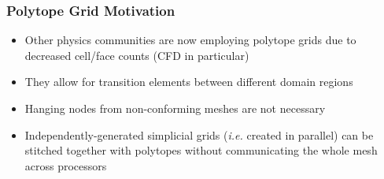 \documentclass[compress,10pt]{beamer}
\begin{document}
\begin{frame}[t]\frametitle{Polytope Grid Motivation}
         \begin{block}{}{\footnotesize
			\begin{itemize}
				\item <1-> Other physics communities are now employing polytope grids due to decreased cell/face counts (CFD in particular)
				\item <2-> They allow for transition elements between different domain regions
				\item <3-> Hanging nodes from non-conforming meshes are not necessary
				\item <4-> Independently-generated simplicial grids ({\em i.e.} created in parallel) can be stitched together with polytopes without communicating the whole mesh across processors
			\end{itemize}}
         \end{block}
\centering
{}
\end{frame}
\end{document}

